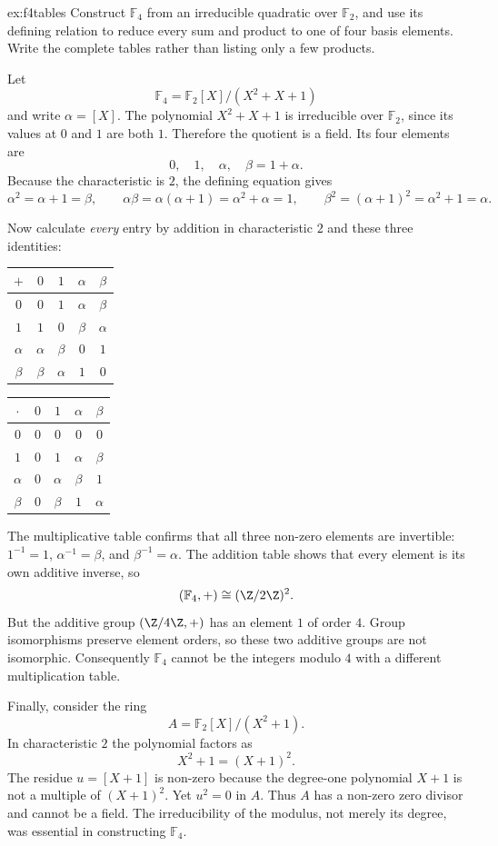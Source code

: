 \begin{solution}{ex:f4tables}
\idea Construct $\mathbb F_4$ from an irreducible quadratic over $\mathbb F_2$, and use its defining relation to reduce every sum and product to one of four basis elements. Write the complete tables rather than listing only a few products.

\writeup Let
\[
\mathbb F_4=\mathbb F_2[X]/(X^2+X+1)
\]
and write $\alpha=[X]$. The polynomial $X^2+X+1$ is irreducible over $\mathbb F_2$, since its values at $0$ and $1$ are both $1$. Therefore the quotient is a field. Its four elements are
\[
0,\quad1,\quad\alpha,\quad\beta=1+\alpha.
\]
Because the characteristic is $2$, the defining equation gives
\[
\alpha^2=\alpha+1=\beta,\qquad
\alpha\beta=\alpha(\alpha+1)=\alpha^2+\alpha=1,\qquad
\beta^2=(\alpha+1)^2=\alpha^2+1=\alpha.
\]

Now calculate \emph{every} entry by addition in characteristic $2$ and these three identities:
\begin{center}
\small
\begin{tabular}{c|cccc}
$+$&$0$&$1$&$\alpha$&$\beta$\\\hline
$0$&$0$&$1$&$\alpha$&$\beta$\\
$1$&$1$&$0$&$\beta$&$\alpha$\\
$\alpha$&$\alpha$&$\beta$&$0$&$1$\\
$\beta$&$\beta$&$\alpha$&$1$&$0$
\end{tabular}
\qquad
\begin{tabular}{c|cccc}
$\cdot$&$0$&$1$&$\alpha$&$\beta$\\\hline
$0$&$0$&$0$&$0$&$0$\\
$1$&$0$&$1$&$\alpha$&$\beta$\\
$\alpha$&$0$&$\alpha$&$\beta$&$1$\\
$\beta$&$0$&$\beta$&$1$&$\alpha$
\end{tabular}
\end{center}

The multiplicative table confirms that all three non-zero elements are invertible: $1^{-1}=1$, $\alpha^{-1}=\beta$, and $\beta^{-1}=\alpha$. The addition table shows that every element is its own additive inverse, so
\[
(\mathbb F_4,+)\cong(\Z/2\Z)^2.
\]
But the additive group $(\Z/4\Z,+)$ has an element $1$ of order $4$. Group isomorphisms preserve element orders, so these two additive groups are not isomorphic. Consequently $\mathbb F_4$ cannot be the integers modulo $4$ with a different multiplication table.

Finally, consider the ring
\[
A=\mathbb F_2[X]/(X^2+1).
\]
In characteristic $2$ the polynomial factors as
\[
X^2+1=(X+1)^2.
\]
The residue $u=[X+1]$ is non-zero because the degree-one polynomial $X+1$ is not a multiple of $(X+1)^2$. Yet $u^2=0$ in $A$. Thus $A$ has a non-zero zero divisor and cannot be a field. The irreducibility of the modulus, not merely its degree, was essential in constructing $\mathbb F_4$.
\end{solution}

